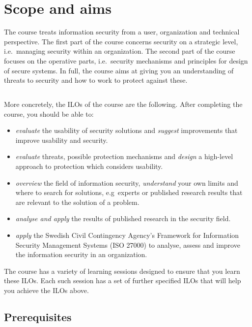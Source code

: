 \section{Scope and aims}
\label{sec:aim}
The course treats information security from a user, organization and technical 
perspective.
The first part of the course concerns security on a strategic level, i.e.\ 
managing security within an organization.
The second part of the course focuses on the operative parts, i.e.\ security 
mechanisms and principles for design of secure systems.
In full, the course aims at giving you an understanding of threats to security 
and how to work to protect against these.

\subsection{}

More concretely, the \acp{ILO} of the course are the following.
After completing the course, you should be able to:
\begin{itemize}
  \item \emph{evaluate} the usability of security solutions and \emph{suggest} 
    improvements that improve usability and security.
  \item \emph{evaluate} threats, possible protection mechanisms and 
    \emph{design} a high-level approach to protection which considers 
    usability.
  \item \emph{overview} the field of information security, \emph{understand} 
    your own limits and where to search for solutions, e.g\ experts or 
    published research results that are relevant to the solution of a problem.
  \item \emph{analyse and apply} the results of published research in the 
    security field.
  \item \emph{apply} the Swedish Civil Contingency Agency's Framework for 
    Information Security Management Systems (ISO 27000) to analyse, assess and 
    improve the information security in an organization.
\end{itemize}
The course has a variety of learning sessions designed to ensure that you learn 
these \acp{ILO}.
Each such session has a set of further specified \acp{ILO} that will help you 
achieve the \acp{ILO} above.

\subsection{Prerequisites}

